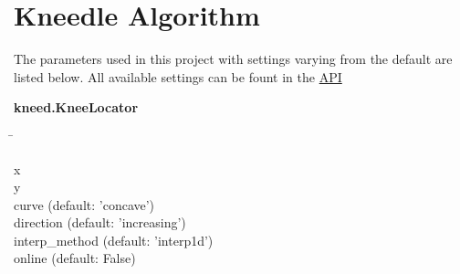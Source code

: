 \section{Kneedle Algorithm} \label{sec:Kneedle}

\blindtext
\autocite{satopaa_finding_2011}

The parameters used in this project with settings varying from the default are listed below. All available settings can be fount in the \href{https://kneed.readthedocs.io/en/stable/api.html}{API}

\begin{leftbar}
    \textbf{kneed.KneeLocator}
    \begin{nstabbing}
        \qquad\qquad\qquad\qquad\qquad\quad\=\kill

        x \> \\
        
        y \> \\
        
        curve \> (default: 'concave')\\
        
        direction \> (default: 'increasing')\\
        
        interp\_method \> (default: 'interp1d')\\
        
        online \> (default: False)\\
        
    \end{nstabbing}
\end{leftbar}

